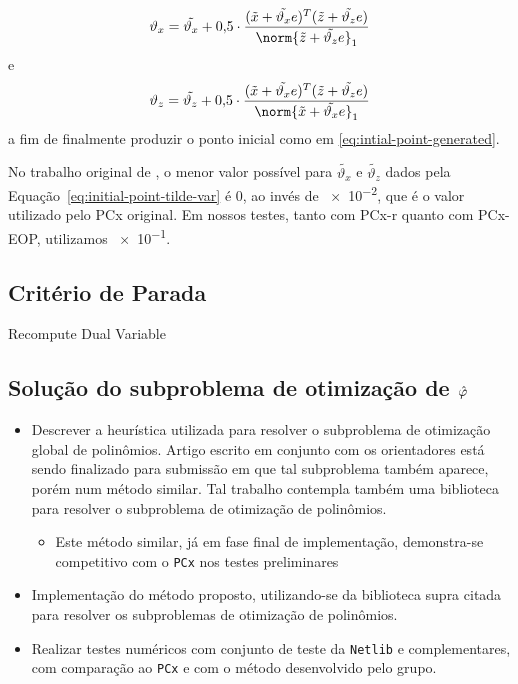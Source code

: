 \begin{equation}
	\label{eq:initial-point-var-x}
\vartheta_{x} = \tilde{\vartheta_x} + \num{0.5}\cdot\dfrac{(\xtil+\tilde{\vartheta_x} e)^{T}(\ztil+\tilde{\vartheta_z} e)}{\norm{\ztil+\tilde{\vartheta_z} e}_{1}} 
\end{equation}
e
\begin{equation}
	\label{eq:initial-point-var-z}
\vartheta_{z} = \tilde{\vartheta_z} + \num{0.5}\cdot\dfrac{(\xtil+\tilde{\vartheta_x} e)^{T}(\ztil+\tilde{\vartheta_z} e)}{\norm{\xtil+\tilde{\vartheta_x} e}_{1}} 
\end{equation}
a fim de finalmente produzir o ponto inicial como em \eqref{eq:intial-point-generated}.

No trabalho original de \textcite{Mehrotra:1992wr}, o menor valor possível para  $\tilde{\vartheta_x}$ e $\tilde{\vartheta_z}$ dados pela Equação~\eqref{eq:initial-point-tilde-var} é $\num{0}$, ao invés de \num{e-2}, 	que é o valor utilizado pelo PCx original. Em nossos testes, tanto com PCx-r quanto com PCx-EOP, utilizamos \num{e-1}. 


\subsection{Critério de Parada}

Recompute Dual Variable

\subsection{Solução do subproblema de otimização \texorpdfstring{de $\hat{\varphi}$}{da função de mérito}}


\begin{itemize}
\item Descrever a heurística utilizada para resolver o subproblema de otimização
global de polinômios. Artigo escrito em conjunto com os orientadores está sendo
finalizado para submissão em que tal subproblema também aparece, porém num
método similar. Tal trabalho contempla também uma biblioteca para resolver o
subproblema de otimização de polinômios.
\begin{itemize}
  \item Este método similar, já em fase final de implementação,
  demonstra-se competitivo com o \texttt{PCx} nos testes preliminares
 \end{itemize}
\item Implementação do método proposto, utilizando-se da biblioteca supra
citada para resolver os subproblemas de otimização de polinômios.
\item Realizar  testes
numéricos com conjunto de teste da \texttt{Netlib} e complementares, com
comparação ao \texttt{PCx} e com o método desenvolvido pelo grupo.
\end{itemize}



